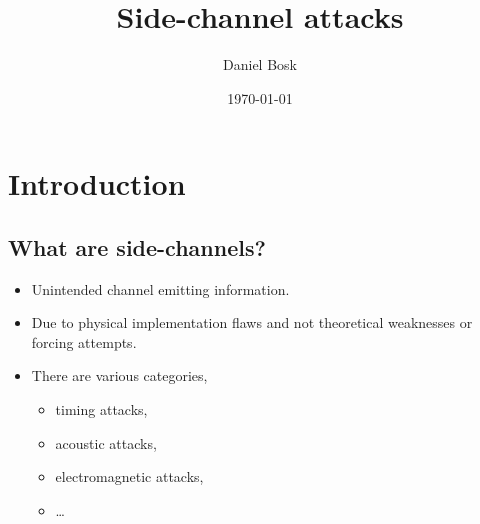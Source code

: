 \title{%
  Side-channel attacks
}
\author{Daniel Bosk}
\date{\today}


\begin{frame}
  \maketitle{}
\end{frame}





\section{Introduction}

\subsection{What are side-channels?}

\begin{frame}
  \begin{definition}
    \begin{itemize}
      \item Unintended channel emitting information.
      \item Due to physical implementation flaws and not theoretical weaknesses 
        or forcing attempts.
    \end{itemize}
  \end{definition}
\end{frame}

\begin{frame}
  \begin{itemize}
    \item There are various categories, \eg
      \begin{itemize}
        \item timing attacks,
        \item acoustic attacks,
        \item electromagnetic attacks,
        \item \dots
      \end{itemize}
  \end{itemize}
\end{frame}


